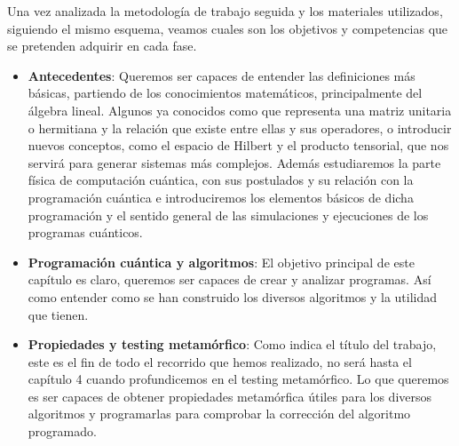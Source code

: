 Una vez analizada la metodología de trabajo seguida y los materiales utilizados, siguiendo el mismo esquema, veamos cuales son los objetivos y competencias que se pretenden adquirir en cada fase.

\begin{itemize}
    \item \textbf{Antecedentes}: Queremos ser capaces de entender las definiciones más básicas, partiendo de los conocimientos matemáticos, principalmente del álgebra lineal. Algunos ya conocidos como que representa una matriz unitaria o hermitiana y la relación que existe entre ellas y sus operadores, o introducir nuevos conceptos, como el espacio de Hilbert y el producto tensorial, que nos servirá para generar sistemas más complejos. Además estudiaremos la parte física de computación cuántica, con sus postulados y su relación con la programación cuántica e introduciremos los elementos básicos de dicha programación y el sentido general de las simulaciones y ejecuciones de los programas cuánticos.
    
    \item \textbf{Programación cuántica y algoritmos}: El objetivo principal de este capítulo es claro, queremos ser capaces de crear y analizar programas. Así como entender como se han construido los diversos algoritmos y la utilidad que tienen.

    \item \textbf{Propiedades y testing metamórfico}: Como indica el título del trabajo, este es el fin de todo el recorrido que hemos realizado, no será hasta el capítulo 4 cuando profundicemos en el testing metamórfico. Lo que queremos es ser capaces de obtener propiedades metamórfica útiles para los diversos algoritmos y programarlas para comprobar la corrección del algoritmo programado.
\end{itemize}

\vspace{1cm}